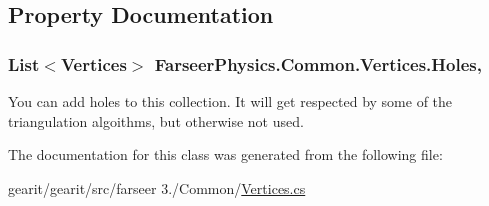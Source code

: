 \subsection{Property Documentation}
\hypertarget{class_farseer_physics_1_1_common_1_1_vertices_a3967b79e34107fbe5d81f1a2940bdc24}{
\subsubsection[{Holes}]{\setlength{\rightskip}{0pt plus 5cm}List$<${\bf Vertices}$>$ Farseer\+Physics.\+Common.\+Vertices.\+Holes\hspace{0.3cm}{\ttfamily [get]}, {\ttfamily [set]}}}\label{class_farseer_physics_1_1_common_1_1_vertices_a3967b79e34107fbe5d81f1a2940bdc24}


You can add holes to this collection. It will get respected by some of the triangulation algoithms, but otherwise not used. 



The documentation for this class was generated from the following file\+:\begin{DoxyCompactItemize}
\item 
gearit/gearit/src/farseer 3./\+Common/\hyperlink{_vertices_8cs}{Vertices.\+cs}\end{DoxyCompactItemize}
